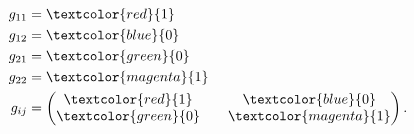 \begin{equation}
	\begin{aligned}
		g_{11} &= \textcolor{red}{1} \\
		g_{12} &= \textcolor{blue}{0} \\
		g_{21} &= \textcolor{green}{0} \\
		g_{22} &= \textcolor{magenta}{1} \\
		g_{ij} &= \begin{pmatrix} \textcolor{red}{1} && \textcolor{blue}{0} \\ \textcolor{green}{0} && \textcolor{magenta}{1} \end{pmatrix} .
	\end{aligned}
\end{equation}

